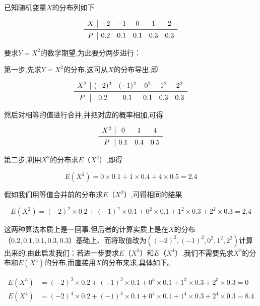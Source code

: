\begin{example}
	已知随机变量$ X $的分布列如下
	
	\[
	\begin{array}{c|ccccc}
	X &{-2} & {-1} & {0} & {1} & {2} \\ \midrule
	P & {0.2} & {0.1} & {0.1} & {0.3} & {0.3}
	\end{array}
	\]
	
	要求$ Y=X^2 $的数学期望,为此要分两步进行：
	
	第一步,先求$ Y=X^2 $的分布,这可从$ X $的分布导出,即
	
	\[
	\begin{array}{c|ccccc}
	X^2    & (-2)^2 & (-1)^2 & 0^2    & 1^2    & 2^2 \\\midrule
	P     & 0.2   & 0.1   & 0.1   & 0.3   & 0.3 \\
	\end{array}
	\]
	
	然后对相等的值进行合并,并把对应的概率相加,可得
	
	\[
	\begin{array}{c|ccc}
	X^2    & 0     & 1     & 4 \\\midrule
	P     & 0.1   & 0.4   & 0.5 \\
	\end{array}
	\]
	
	第二步,利用$ X^2 $的分布求$ E（X^2） $,即得
	
	\[
	E\left(X^{2}\right)=0 \times 0.1+1 \times 0.4+4 \times 0.5=2.4
	\]
	
	假如我们用等值合并前的分布求$ E（X^2） $,可得相同的结果
	
	\[
	E\left(X^{2}\right)=(-2)^{2} \times 0.2+(-1)^{2} \times 0.1+0^{2} \times 0.1+1^{2} \times 0.3+2^{2} \times 0.3=2.4
	\]
	
	这两种算法本质上是一回事,但后者的计算实质上是在$ X $的分布$ （0.2,
	0.1,0.1,0.3,0.3） $基础上、而将取值改为$\left((-2)^{2},(-1)^{2}, 0^{2}, 1^{2}, 2^{2}\right)$计算出来的.由此启发我们：若进一步要求$ E（X^3） $和$ E（X^4） $,我们不需要先求$ X^3 $的分布和$ E\left(X^{4}\right) $的分布,而直接用$ X $的分布来求,具体如下。
	
	\[
	\begin{aligned} 
	E\left(X^{3}\right) &=(-2)^{3} \times 0.2+(-1)^{3} \times 0.1+0^{3} \times 0.1+1^{3} \times 0.3+2^{3} \times 0.3=0 \\ E\left(X^{4}\right) &=(-2)^{4} \times 0.2+(-1)^{4} \times 0.1+0^{4} \times 0.1+1^{4} \times 0.3+2^{4} \times 0.3=8.4 
	\end{aligned}
	\]
	
\end{example}



